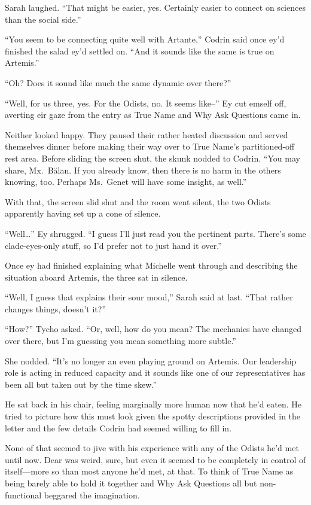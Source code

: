 Sarah laughed. ``That might be easier, yes. Certainly easier to connect on sciences than the social side.''

``You seem to be connecting quite well with Artante,'' Codrin said once ey'd finished the salad ey'd settled on. ``And it sounds like the same is true on Artemis.''

``Oh? Does it sound like much the same dynamic over there?''

``Well, for us three, yes. For the Odists, no. It seems like--'' Ey cut emself off, averting eir gaze from the entry as True Name and Why Ask Questions came in.

Neither looked happy. They paused their rather heated discussion and served themselves dinner before making their way over to True Name's partitioned-off rest area. Before sliding the screen shut, the skunk nodded to Codrin. ``You may share, Mx.~Bălan. If you already know, then there is no harm in the others knowing, too. Perhaps Ms.~Genet will have some insight, as well.''

With that, the screen slid shut and the room went silent, the two Odists apparently having set up a cone of silence.

``Well\ldots{}'' Ey shrugged. ``I guess I'll just read you the pertinent parts. There's some clade-eyes-only stuff, so I'd prefer not to just hand it over.''

Once ey had finished explaining what Michelle went through and describing the situation aboard Artemis, the three sat in silence.

``Well, I guess that explains their sour mood,'' Sarah said at last. ``That rather changes things, doesn't it?''

``How?'' Tycho asked. ``Or, well, how do you mean? The mechanics have changed over there, but I'm guessing you mean something more subtle.''

She nodded. ``It's no longer an even playing ground on Artemis. Our leadership role is acting in reduced capacity and it sounds like one of our representatives has been all but taken out by the time skew.''

He sat back in his chair, feeling marginally more human now that he'd eaten. He tried to picture how this must look given the spotty descriptions provided in the letter and the few details Codrin had seemed willing to fill in.

None of that seemed to jive with his experience with any of the Odists he'd met until now. Dear was weird, sure, but even it seemed to be completely in control of itself—more so than most anyone he'd met, at that. To think of True Name as being barely able to hold it together and Why Ask Questions all but non-functional beggared the imagination.

